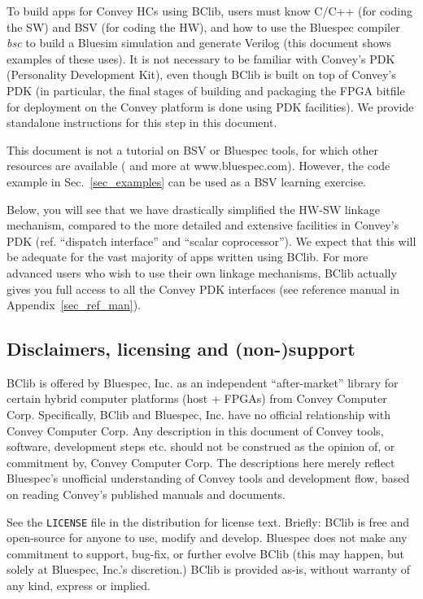\documentclass[twoside,letterpaper,11pt]{article}
\begin{document}
To build apps for Convey HCs using BClib, users must know C/C++ (for
coding the SW) and BSV (for coding the HW), and how to use the
Bluespec compiler \emph{bsc} to build a Bluesim simulation and
generate Verilog (this document shows examples of these uses).  It is
not necessary to be familiar with Convey's PDK (Personality
Development Kit), even though BClib is built on top of Convey's PDK
(in particular, the final stages of building and packaging the FPGA
bitfile for deployment on the Convey platform is done using PDK
facilities).  We provide standalone instructions for this step in this
document.

This document is not a tutorial on BSV or Bluespec tools, for which
other resources are available (\cite{Bluespec2011a,Bluespec2011b} and more at
www.bluespec.com).  However, the code example in
Sec.~\ref{sec_examples} can be used as a BSV learning exercise.

Below, you will see that we have drastically simplified the HW-SW
linkage mechanism, compared to the more detailed and extensive
facilities in Convey's PDK (ref. ``dispatch interface'' and ``scalar
coprocessor'').  We expect that this will be adequate for the vast
majority of apps written using BClib.  For more advanced users who
wish to use their own linkage mechanisms, BClib actually gives you
full access to all the Convey PDK interfaces (see reference manual in
Appendix~\ref{sec_ref_man}).


\subsection{Disclaimers, licensing and (non-)support}

BClib is offered by Bluespec, Inc. as an independent ``after-market''
library for certain hybrid computer platforms (host + FPGAs) from
Convey Computer Corp.  Specifically, BClib and Bluespec, Inc. have no
official relationship with Convey Computer Corp.  Any description in
this document of Convey tools, software, development steps etc. should
not be construed as the opinion of, or commitment by, Convey Computer
Corp.  The descriptions here merely reflect Bluespec's unofficial
understanding of Convey tools and development flow, based on reading
Convey's published manuals and documents.

See the \verb|LICENSE| file in the distribution for license text.
Briefly: BClib is free and open-source for anyone to use, modify and
develop.  Bluespec does not make any commitment to support, bug-fix,
or further evolve BClib (this may happen, but solely at Bluespec,
Inc.'s discretion.)  BClib is provided as-is, without warranty of any
kind, express or implied.
\end{document}

